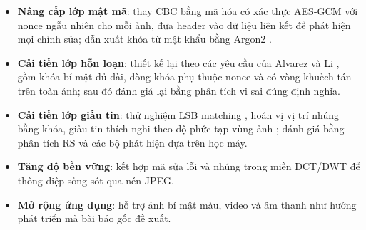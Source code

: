 \begin{itemize}
  \item \textbf{Nâng cấp lớp mật mã}: thay CBC bằng mã hóa có xác thực AES-GCM \cite{sp80038d} với
        nonce ngẫu nhiên cho mỗi ảnh, đưa header vào dữ liệu liên kết để phát hiện mọi chỉnh sửa; dẫn
        xuất khóa từ mật khẩu bằng Argon2 \cite{rfc9106}.
  \item \textbf{Cải tiến lớp hỗn loạn}: thiết kế lại theo các yêu cầu của Alvarez và Li
        \cite{alvarez2006}, gồm khóa bí mật đủ dài, dòng khóa phụ thuộc nonce và có vòng khuếch tán
        trên toàn ảnh; sau đó đánh giá lại bằng phân tích vi sai đúng định nghĩa.
  \item \textbf{Cải tiến lớp giấu tin}: thử nghiệm LSB matching \cite{mielikainen2006}, hoán vị vị
        trí nhúng bằng khóa, giấu tin thích nghi theo độ phức tạp vùng ảnh \cite{holub2014}; đánh giá
        bằng phân tích RS và các bộ phát hiện dựa trên học máy.
  \item \textbf{Tăng độ bền vững}: kết hợp mã sửa lỗi và nhúng trong miền DCT/DWT để thông điệp sống
        sót qua nén JPEG.
  \item \textbf{Mở rộng ứng dụng}: hỗ trợ ảnh bí mật màu, video và âm thanh như hướng phát triển mà
        bài báo gốc đề xuất.
\end{itemize}
